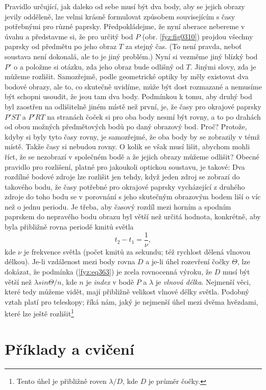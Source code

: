     Pravidlo určující, jak daleko od sebe musí být dva body, aby se jejich obrazy jevily odděleně, 
    lze velmi krásně formulovat způsobem souvisejícím s časy potřebnými pro různé paprsky. 
    Předpokládejme, že nyní aberace nebereme v úvahu a představme si, že pro určitý bod \(P\) (obr. 
    \ref{fyz:fig0310}) projdou všechny paprsky od předmětu po jeho obraz \(T\) za stejný čas. (To 
    není pravda, neboť soustava není dokonalá, ale to je jiný problém.) Nyní si vezměme jiný blízký 
    bod \(P'\) o a položme si otázku, zda jeho obraz bude odlišný od \(T\). Jinými slovy, zda je 
    můžeme rozlišit. Samozřejmě, podle geometrické optiky by měly existovat dva bodové obrazy, ale 
    to, co skutečně uvidíme, může být dost rozmazané a nemusíme být schopni usoudit, že jsou tam 
    dva body. Podmínkou k tomu, aby druhý bod byl zaostřen na odlišitelně jiném místě než první, 
    je, že časy pro okrajové paprsky \(P'ST\) a \(P'RT\) na stranách čoček si pro oba body nesmí 
    být rovny, a to po drahách od obou možných předmětových bodů po daný obrazový bod. Proč? 
    Protože, kdyby si byly tyto časy rovny, je samozřejmé, že oba body by se zobrazily v témž 
    místě. Takže časy si nebudou rovny. O kolik se však musí lišit, abychom mohli říct, že se 
    nezobrazí v společném bodě a že jejich obrazy můžeme odlišit? Obecné pravidlo pro rozlišení, 
    platné pro jakoukoli optickou soustavu, je takové: Dva rozdílné bodové zdroje lze rozlišit jen 
    tehdy, když jeden zdroj se zobrazí do takového bodu, že časy potřebné pro okrajové paprsky 
    vycházející z druhého zdroje do toho bodu se v porovnání s jeho skutečným obrazovým bodem liší 
    o víc než o jednu periodu. Je třeba, aby časový rozdíl mezi horním a spodním paprskem do 
    nepravého bodu obrazu byl větší než určitá hodnota, konkrétně, aby byla přibližně rovna periodě 
    kmitů světla
    \begin{equation}\label{fyz:eq363}
       t_2 - t_1 = \frac{1}{\nu},
    \end{equation}    
    kde \(\nu\) je frekvence světla (počet kmitů za sekundu; též rychlost dělená vlnovou délkou). 
    Je-li vzdálenost mezi body rovna \(D\) a je-li úhel rozevření čočky \(\varTheta\), lze dokázat, 
    že podmínka (\ref{fyz:eq363}) je zcela rovnocenná výroku, že \(D\) musí být větší než \(\lambda 
    sin\varTheta/n\), kde \(n\) je \emph{index} v bodě \(P\) a \(\lambda\) je \emph{vlnová délka}. 
    Nejmenší věci, které tedy můžeme vidět, mají přibližně velikost vlnové délky světla. Podobný 
    vztah platí pro teleskopy; říká nám, jaký je nejmenší úhel mezi dvěma hvězdami, které lze ještě 
    rozlišit\footnote{Tento úhel je přibližně roven \(\lambda/D\), kde \(D\) je průměr čočky.}
    
  \section{Příklady a cvičení}\label{fyz:IchapXXVIIsecVIII}


